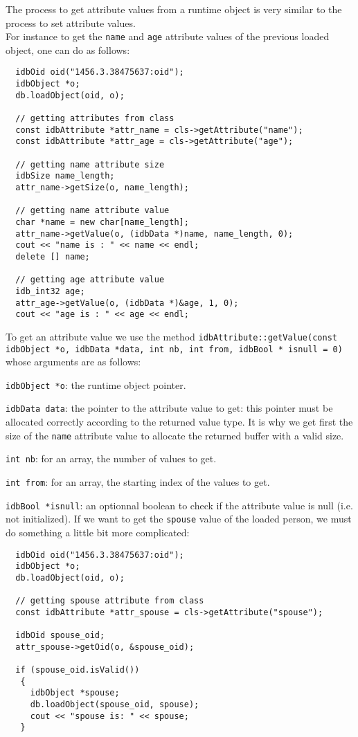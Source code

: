 The process to get attribute values from a runtime object is very similar
to the process to set attribute values.
\\
For instance to get the \texttt{name} and \texttt{age} attribute values of
the previous loaded object, one can do as follows:
\verbsize
\begin{verbatim}
  idbOid oid("1456.3.38475637:oid");
  idbObject *o;
  db.loadObject(oid, o);

  // getting attributes from class
  const idbAttribute *attr_name = cls->getAttribute("name");
  const idbAttribute *attr_age = cls->getAttribute("age");

  // getting name attribute size
  idbSize name_length;
  attr_name->getSize(o, name_length);

  // getting name attribute value
  char *name = new char[name_length];
  attr_name->getValue(o, (idbData *)name, name_length, 0);
  cout << "name is : " << name << endl;
  delete [] name;

  // getting age attribute value
  idb_int32 age;
  attr_age->getValue(o, (idbData *)&age, 1, 0);
  cout << "age is : " << age << endl;
\end{verbatim}
\normalsize
To get an attribute value we use the method
\texttt{idbAttribute::getValue(const idbObject *o, idbData *data,
int nb, int from, idbBool * isnull = 0)} whose arguments are as follows:
\be
\item \texttt{idbObject *o}: the runtime object pointer.
\item \texttt{idbData data}: the pointer to the attribute value to get: this
pointer must be allocated correctly according to the returned value type.
It is why we get first the size of the \texttt{name} attribute value to allocate
the returned buffer with a valid size.
\item \texttt{int nb}: for an array, the number of values to get.
\item \texttt{int from}: for an array, the starting index of the values to get.
\item \texttt{idbBool *isnull}: an optionnal boolean to check if the attribute
value is null (i.e. not initialized).
\ee
If we want to get the \texttt{spouse} value of the loaded person,
we must do something a little bit more complicated:
\verbsize
\begin{verbatim}
  idbOid oid("1456.3.38475637:oid");
  idbObject *o;
  db.loadObject(oid, o);

  // getting spouse attribute from class
  const idbAttribute *attr_spouse = cls->getAttribute("spouse");

  idbOid spouse_oid;
  attr_spouse->getOid(o, &spouse_oid);

  if (spouse_oid.isValid())
   {
     idbObject *spouse;
     db.loadObject(spouse_oid, spouse);
     cout << "spouse is: " << spouse;
   }
\end{verbatim}
